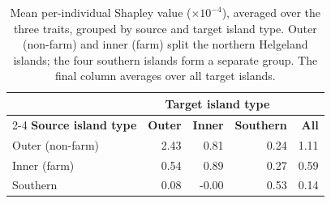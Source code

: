 \begin{table}[H]
\centering
\small
\renewcommand{\arraystretch}{1.1}
\begin{tabular}{@{}lrrrr@{}}
\toprule
 & \multicolumn{3}{c}{\textbf{Target island type}} & \\
\cmidrule(lr){2-4}
\textbf{Source island type} & \textbf{Outer} & \textbf{Inner} & \textbf{Southern} & \textbf{All} \\
\midrule
Outer (non-farm) & 2.43 & 0.81 & 0.24 & 1.11 \\
Inner (farm) & 0.54 & 0.89 & 0.27 & 0.59 \\
Southern & 0.08 & -0.00 & 0.53 & 0.14 \\
\bottomrule
\end{tabular}
\caption[Shapley value by island type]{Mean per-individual Shapley value ($\times 10^{-4}$), averaged over the three traits, grouped by source and target island type. Outer (non-farm) and inner (farm) split the northern Helgeland islands; the four southern islands form a separate group. The final column averages over all target islands.}
\label{tab:shapley_island_type}
\end{table}
